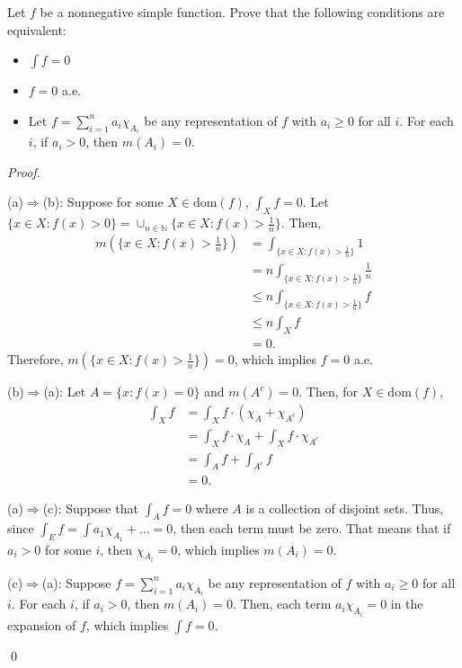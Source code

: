 \documentclass[12pt]{article}
\newenvironment{problem}[2][Problem]{\begin{trivlist}
\item[\hskip \labelsep {\bfseries #1}\hskip \labelsep {\bfseries
#2.}]}{\end{trivlist}}
\newenvironment{sol}
    {\emph{Proof.}
    }
    {
    \qed
    }
\begin{document}
      \begin{problem}{47}
        Let $f$ be a nonnegative simple function. Prove that the following conditions are equivalent:
        \begin{itemize}
          \item[(a)] $\int f = 0$
          \item[(b)] $f = 0$ a.e.
          \item[(c)] Let $f = \sum_{i = 1}^{n}a_i\chi_{A_i}$ be any representation of $f$ with $a_i \geq 0$ for all $i$. For each $i$, if $a_i > 0$, then $m(A_i) = 0$.
        \end{itemize}
      
        \begin{sol}
          (a)$\Longrightarrow$(b): Suppose for some $X \in \text{dom}(f)$, $\int_X f = 0$. Let $\{x \in X : f(x) > 0\} = \cup_{n \in \mathbb{N}}\{x \in X : f(x) > \frac{1}{n}\}$. Then, 
          \begin{align*}
            m(\{x \in X : f(x) > \frac{1}{n}\}) &= \int_{\{x \in X : f(x) > \frac{1}{n}\}}1 \\
            &= n \int_{\{x \in X : f(x) > \frac{1}{n}\}} \frac{1}{n} \\
            &\leq n \int_{\{x \in X : f(x) > \frac{1}{n}\}} f \\
            &\leq n \int_{X} f \\
            &=0.
          \end{align*}
          Therefore, $m(\{x \in X : f(x) > \frac{1}{n}\}) = 0$, which implies $f = 0$ a.e.
      
          \vspace{1em}
      
          (b)$\Longrightarrow$(a): Let $A = \{x : f(x) = 0\}$ and $m(A^c) = 0$. Then, for $X \in \text{dom}(f)$, 
          \begin{align*}
            \int_X f &= \int_X f \cdot (\chi_A + \chi_{A^{c}}) \\
            &= \int_X f \cdot \chi_A + \int_X f \cdot \chi_{A^{c}} \tag*{(Since $A \cap A^c = \emptyset$)} \\
            &= \int_A f + \int_{A^c} f \\
            &= 0.
          \end{align*}
      
          \vspace{1em}
      
          (a)$\Longrightarrow$(c): Suppose that $\int_A f = 0$ where $A$ is a collection of disjoint sets. Thus, since $\int_E f = \int a_1\chi_{A_1} + \dots = 0$, then each term must be zero. That means that if $a_i > 0$ for some $i$, then $\chi_{A_i} = 0$, which implies $m(A_i) = 0$. 
      
          \vspace{1em}
      
          (c)$\Longrightarrow$(a): Suppose $f = \sum_{i = 1}^{n}a_i\chi_{A_i}$ be any representation of $f$ with $a_i \geq 0$ for all $i$. For each $i$, if $a_i > 0$, then $m(A_i) = 0$. Then, each term $a_i\chi_{A_i} = 0$ in the expansion of $f$, which implies $\int f = 0$.
        \end{sol}
      \end{problem}
\end{document}
